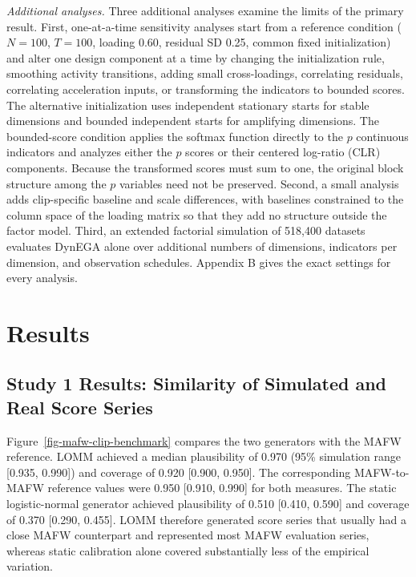 \documentclass[
]{article}
\begin{document}
\emph{Additional analyses.} Three additional analyses examine the limits
of the primary result. First, one-at-a-time sensitivity analyses start
from a reference condition (\(N=100\), \(T=100\), loading 0.60, residual
SD 0.25, common fixed initialization) and alter one design component at
a time by changing the initialization rule, smoothing activity
transitions, adding small cross-loadings, correlating residuals,
correlating acceleration inputs, or transforming the indicators to
bounded scores. The alternative initialization uses independent
stationary starts for stable dimensions and bounded independent starts
for amplifying dimensions. The bounded-score condition applies the
softmax function directly to the \(p\) continuous indicators and
analyzes either the \(p\) scores or their centered log-ratio (CLR)
components. Because the transformed scores must sum to one, the original
block structure among the \(p\) variables need not be preserved. Second,
a small analysis adds clip-specific baseline and scale differences, with
baselines constrained to the column space of the loading matrix so that
they add no structure outside the factor model. Third, an extended
factorial simulation of 518,400 datasets evaluates DynEGA alone over
additional numbers of dimensions, indicators per dimension, and
observation schedules. Appendix B gives the exact settings for every
analysis.

\section{Results}\label{results}

\subsection{Study 1 Results: Similarity of Simulated and Real Score
Series}\label{study-1-results-similarity-of-simulated-and-real-score-series}

Figure~\ref{fig-mafw-clip-benchmark} compares the two generators with
the MAFW reference. LOMM achieved a median plausibility of 0.970 (95\%
simulation range {[}0.935, 0.990{]}) and coverage of 0.920 {[}0.900,
0.950{]}. The corresponding MAFW-to-MAFW reference values were 0.950
{[}0.910, 0.990{]} for both measures. The static logistic-normal
generator achieved plausibility of 0.510 {[}0.410, 0.590{]} and coverage
of 0.370 {[}0.290, 0.455{]}. LOMM therefore generated score series that
usually had a close MAFW counterpart and represented most MAFW
evaluation series, whereas static calibration alone covered
substantially less of the empirical variation.
\end{document}
